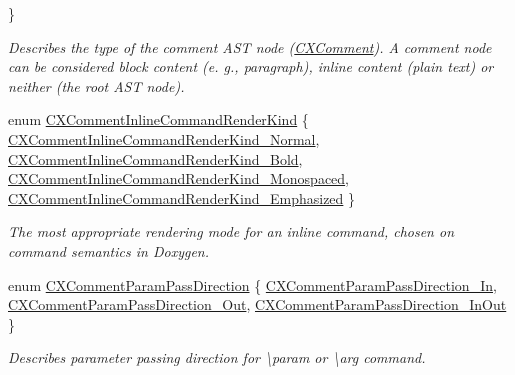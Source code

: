 \begin{DoxyCompactItemize}
 \}
\begin{DoxyCompactList}\small\item\em Describes the type of the comment A\+ST node ({\ttfamily \mbox{\hyperlink{structCXComment}{C\+X\+Comment}}}). A comment node can be considered block content (e. g., paragraph), inline content (plain text) or neither (the root A\+ST node). \end{DoxyCompactList}\item 
enum \mbox{\hyperlink{group__CINDEX__COMMENT_ga23efacd9c1e4e286a9f9714e1720fdcf}{C\+X\+Comment\+Inline\+Command\+Render\+Kind}} \{ \mbox{\hyperlink{group__CINDEX__COMMENT_gga23efacd9c1e4e286a9f9714e1720fdcfa83c59bf303aff52a2ebb2a4ac639ba1e}{C\+X\+Comment\+Inline\+Command\+Render\+Kind\+\_\+\+Normal}}, 
\mbox{\hyperlink{group__CINDEX__COMMENT_gga23efacd9c1e4e286a9f9714e1720fdcfac53920a0bf8aa489b8ba71bea3552c6c}{C\+X\+Comment\+Inline\+Command\+Render\+Kind\+\_\+\+Bold}}, 
\mbox{\hyperlink{group__CINDEX__COMMENT_gga23efacd9c1e4e286a9f9714e1720fdcfa24ed7a03d9514af7268cca4cbd756569}{C\+X\+Comment\+Inline\+Command\+Render\+Kind\+\_\+\+Monospaced}}, 
\mbox{\hyperlink{group__CINDEX__COMMENT_gga23efacd9c1e4e286a9f9714e1720fdcfa0a20ae12d7c3a4a8cb8b064497a35410}{C\+X\+Comment\+Inline\+Command\+Render\+Kind\+\_\+\+Emphasized}}
 \}
\begin{DoxyCompactList}\small\item\em The most appropriate rendering mode for an inline command, chosen on command semantics in Doxygen. \end{DoxyCompactList}\item 
enum \mbox{\hyperlink{group__CINDEX__COMMENT_gafadf6e52217ea74d1a014198df656ee1}{C\+X\+Comment\+Param\+Pass\+Direction}} \{ \mbox{\hyperlink{group__CINDEX__COMMENT_ggafadf6e52217ea74d1a014198df656ee1a4f3a96a7ded21c670b2a7454518dd533}{C\+X\+Comment\+Param\+Pass\+Direction\+\_\+\+In}}, 
\mbox{\hyperlink{group__CINDEX__COMMENT_ggafadf6e52217ea74d1a014198df656ee1a08ec465aa9d53cecb76ee77209bdafac}{C\+X\+Comment\+Param\+Pass\+Direction\+\_\+\+Out}}, 
\mbox{\hyperlink{group__CINDEX__COMMENT_ggafadf6e52217ea74d1a014198df656ee1a26ad093a44adda407f28a65e6b1e4e8b}{C\+X\+Comment\+Param\+Pass\+Direction\+\_\+\+In\+Out}}
 \}
\begin{DoxyCompactList}\small\item\em Describes parameter passing direction for \textbackslash{}param or \textbackslash{}arg command. \end{DoxyCompactList}\end{DoxyCompactItemize}
